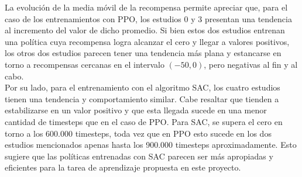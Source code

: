La evolución de la media móvil de la recompensa permite apreciar que, para el caso de los entrenamientos con PPO, los estudios 0 y 3 presentan una tendencia al incremento del valor de dicho promedio. Si bien estos dos estudios entrenan una política cuya recompensa logra alcanzar el cero y llegar a valores positivos, los otros dos estudios parecen tener una tendencia más plana y estancarse en torno a recompensas cercanas en el intervalo $(-50, 0)$, pero negativas al fin y al cabo.\\

Por su lado, para el entrenamiento con el algoritmo SAC, los cuatro estudios tienen una tendencia y comportamiento similar. Cabe resaltar que tienden a estabilizarse en un valor positivo y que esta llegada sucede en una menor cantidad de timesteps que en el caso de PPO. Para SAC, se supera el cero en torno a los 600.000 timesteps, toda vez que en PPO esto sucede en los dos estudios mencionados apenas hasta los 900.000 timesteps aproximadamente. Esto sugiere que las políticas entrenadas con SAC parecen ser más apropiadas y eficientes para la tarea de aprendizaje propuesta en este proyecto.\\

